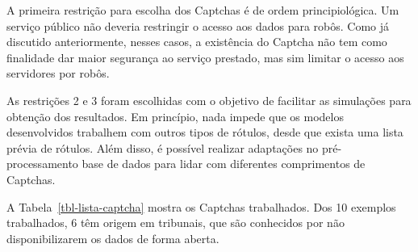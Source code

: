 \documentclass[12pt,twoside,brazilian]{book}
\begin{document}
A primeira restrição para escolha dos Captchas é de ordem
principiológica. Um serviço público não deveria restringir o acesso aos
dados para robôs. Como já discutido anteriormente, nesses casos, a
existência do Captcha não tem como finalidade dar maior segurança ao
serviço prestado, mas sim limitar o acesso aos servidores por robôs.

As restrições 2 e 3 foram escolhidas com o objetivo de facilitar as
simulações para obtenção dos resultados. Em princípio, nada impede que
os modelos desenvolvidos trabalhem com outros tipos de rótulos, desde
que exista uma lista prévia de rótulos. Além disso, é possível realizar
adaptações no pré-processamento base de dados para lidar com diferentes
comprimentos de Captchas.

A Tabela~\ref{tbl-lista-captcha} mostra os Captchas trabalhados. Dos 10
exemplos trabalhados, 6 têm origem em tribunais, que são conhecidos por
não disponibilizarem os dados de forma aberta.
\end{document}
